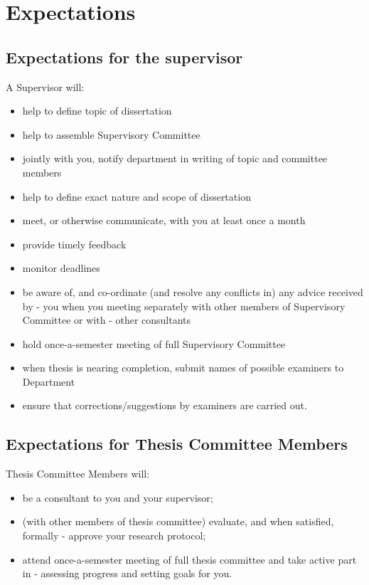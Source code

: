 \documentclass[
]{book}
\providecommand{\tightlist}{%
  \setlength{\itemsep}{0pt}\setlength{\parskip}{0pt}}
\begin{document}
\hypertarget{expectations}{%
\section{Expectations}\label{expectations}}

\hypertarget{expectations-for-the-supervisor}{%
\subsection{Expectations for the supervisor}\label{expectations-for-the-supervisor}}

A Supervisor will:

\begin{itemize}
\tightlist
\item
  help to define topic of dissertation
\item
  help to assemble Supervisory Committee
\item
  jointly with you, notify department in writing of topic and committee members
\item
  help to define exact nature and scope of dissertation
\item
  meet, or otherwise communicate, with you at least once a month
\item
  provide timely feedback
\item
  monitor deadlines
\item
  be aware of, and co-ordinate (and resolve any conflicts in) any advice received by - you when you meeting separately with other members of Supervisory Committee or with - other consultants
\item
  hold once-a-semester meeting of full Supervisory Committee
\item
  when thesis is nearing completion, submit names of possible examiners to Department
\item
  ensure that corrections/suggestions by examiners are carried out.
\end{itemize}

\hypertarget{expectations-for-thesis-committee-members}{%
\subsection{Expectations for Thesis Committee Members}\label{expectations-for-thesis-committee-members}}

Thesis Committee Members will:

\begin{itemize}
\tightlist
\item
  be a consultant to you and your supervisor;
\item
  (with other members of thesis committee) evaluate, and when satisfied, formally - approve your research protocol;
\item
  attend once-a-semester meeting of full thesis committee and take active part in - assessing progress and setting goals for you.
\end{itemize}
\end{document}
